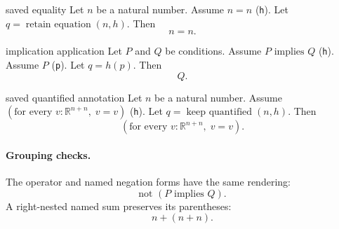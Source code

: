 \begin{cleanresult}{saved equality}
Let $n$ be a natural number.
Assume $n=n$ (\texttt{h}).
Let $q = \operatorname{retain\ equation}(n, h)$.
Then \[n=n.\]
\end{cleanresult}

\begin{cleanresult}{implication application}
Let $P$ and $Q$ be conditions.
Assume $P\text{ implies }Q$ (\texttt{h}).
Assume $P$ (\texttt{p}).
Let $q = h(p)$.
Then \[Q.\]
\end{cleanresult}

\begin{cleanresult}{saved quantified annotation}
Let $n$ be a natural number.
Assume $\left(\text{for every }v : \mathbb{R}^{n+n},\; v=v\right)$ (\texttt{h}).
Let $q = \operatorname{keep\ quantified}(n, h)$.
Then \[\left(\text{for every }v : \mathbb{R}^{n+n},\; v=v\right).\]
\end{cleanresult}

\paragraph{Grouping checks.}
The operator and named negation forms have the same rendering:
\[\text{not }\left(P\text{ implies }Q\right).\]
A right-nested named sum preserves its parentheses:
\[n+\left(n+n\right).\]

